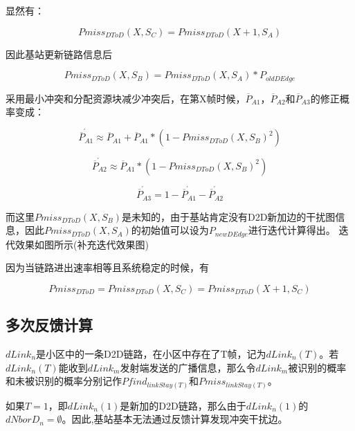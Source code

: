 \documentclass[figurelist,tablelist,algorithmlist,nomlist,masters]{seuthesix}
\begin{document}
	显然有：
	
	\begin{equation}\label{eq3.1}
	Pmis{s_{DToD}}(X,S{_C}) = Pmis{s_{DToD}}(X + 1,S{_A})
	\end{equation}
	
	因此基站更新链路信息后
	
	\begin{equation}\label{eq3.2}
	Pmis{s_{DToD}}(X,S{_B}) = Pmis{s_{DToD}}(X,S{_A})*{P_{oldDEdge}}
	\end{equation}
	
	采用最小冲突和分配资源块减少冲突后，在第X帧时候，${\overline P _{A1}}$，${\overline P _{A2}}$和${\overline P _{A3}}$的修正概率变成：
	
	\begin{equation}\label{eq3.1}
	\acute{\overline P _{A1}} \approx {\overline P _{A1}} + {\overline P _{A1}} * (1 - Pmis{s_{DToD}}{(X,S{_B})^2})
	\end{equation}
	
	\begin{equation}\label{eq3.1}
	\acute{\overline P _{A2}} \approx {\overline P _{A1}} * (1 - Pmis{s_{DToD}}{(X,S{_B})^2})
	\end{equation}
	
	\begin{equation}\label{eq3.1}
	\acute{\overline P _{A3}} = 1 - \acute{\overline P _{A1}} - \acute{\overline P _{A2}}
	\end{equation}
	
	而这里$Pmis{s_{DToD}}{(X,S{_B})}$是未知的，由于基站肯定没有D2D新加边的干扰图信息，因此$Pmis{s_{DToD}}(X,S{_A})$的初始值可以设为${P_{newDEdge}}$进行迭代计算得出。
	迭代效果如图所示(补充迭代效果图)
	
	因为当链路进出速率相等且系统稳定的时候，有
	
	\begin{equation}\label{eq3.1}
	Pmis{s_{DToD}} = Pmis{s_{DToD}}(X,S{_C}) = Pmis{s_{DToD}}(X + 1,S{_C})
	\end{equation}
	
	\subsection{多次反馈计算}
	$dLink_n$是小区中的一条D2D链路，在小区中存在了T帧，记为$dLink_n(T)$。若$dLink_n(T)$能收到$dLink_m$发射端发送的广播信息，那么令$dLink_m$被识别的概率和未被识别的概率分别记作$Pfind_{linkStay(T)}$和$Pmiss_{linkStay(T)}$。
	
	如果$T = 1$，即$dLink_n(1)$是新加的D2D链路，那么由于$dLink_n(1)$的$dNborD_n = \emptyset$。因此,基站基本无法通过反馈计算发现冲突干扰边。
	
\end{document}
